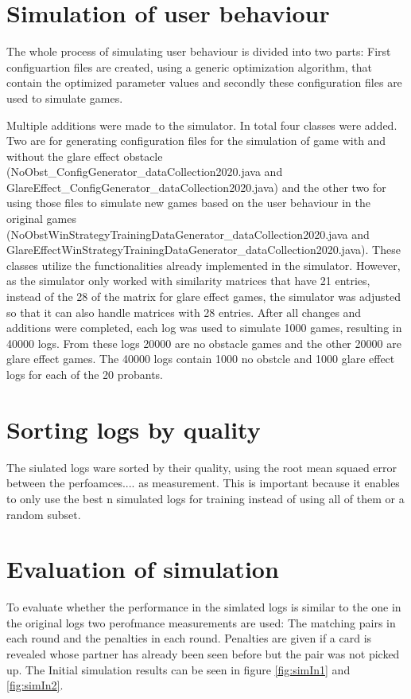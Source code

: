 \section{Simulation of user behaviour}
The whole process of simulating user behaviour is divided into two parts: First configuartion files are created, using a generic optimization algorithm, that contain the optimized parameter values and secondly these configuration files are used to simulate games.

Multiple additions were made to the simulator. In total four classes were added. Two are for generating configuration files for the simulation of game with and without the glare effect obstacle (NoObst\_ConfigGenerator\_dataCollection2020.java and GlareEffect\_ConfigGenerator\_dataCollection2020.java) and the other two for using those files to simulate new games based on the user behaviour in the original games (NoObstWinStrategyTrainingDataGenerator\_dataCollection2020.java and GlareEffectWinStrategyTrainingDataGenerator\_dataCollection2020.java). These classes utilize the functionalities already implemented in the simulator.  However, as the simulator only worked with similarity matrices that have 21 entries, instead of the 28 of the matrix for glare effect games, the simulator was adjusted so that it can also handle matrices with 28 entries. After all changes and additions were completed, each log was used to simulate 1000 games, resulting in 40000 logs. From these logs 20000 are no obstacle games and the other 20000 are glare effect games. The 40000 logs contain 1000 no obstcle and 1000 glare effect logs for each of the 20 probants.  


\section{Sorting logs by quality}
The siulated logs ware sorted by their quality, using the root mean squaed error between the perfoamces.... as measurement. This is important because it enables to only use the best n simulated logs for training instead of using all of them or a random subset. 

\section{Evaluation of simulation}
To evaluate whether the performance in the simlated logs is similar to the one in the original logs two perofmance measurements are used: The matching pairs in each round and the penalties in each round. Penalties are given if a card is revealed whose partner has already been seen before but the pair was not picked up. The Initial simulation results can be seen in figure \ref{fig:simIn1} and \ref{fig:simIn2}. 

